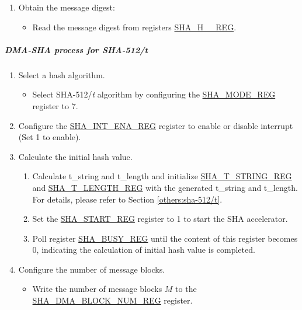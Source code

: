 \documentclass[main\_\_EN.tex]{subfiles}
\begin{document}
\begin{enumerate}
    \item Obtain the message digest:
    \begin{itemize}
        \item Read the message digest from registers \hyperref[regdesc:SHAHNREG]{SHA\_H\_\_REG}.
    \end{itemize}
\end{enumerate}

\subparagraph{DMA-SHA process for SHA-512/{\it{t}}}

\begin{enumerate}
    \item Select a hash algorithm.
    \begin{itemize}
        \item Select SHA-512/{\it{t}} algorithm by configuring the \hyperref[regdesc:SHAMODEREG]{SHA\_MODE\_REG} register to 7.
    \end{itemize}
    
    \item Configure the \hyperref[regdesc:SHAINTENAREG]{SHA\_INT\_ENA\_REG} register to enable or disable interrupt (Set 1 to enable).
    
    \item Calculate the initial hash value.    
        \begin{enumerate}
            \item Calculate t\_string and t\_length and initialize \hyperref[regdesc:SHATSTRINGREG]{SHA\_T\_STRING\_REG} and  \hyperref[regdesc:SHATLENGTHREG]{SHA\_T\_LENGTH\_REG} with the generated t\_string and t\_length. For details, please refer to Section \ref{others:sha-512/t}.
            \item Set the \hyperref[regdesc:SHASTARTREG]{SHA\_START\_REG} register to 1 to start the SHA accelerator.
            \item Poll register \hyperref[regdesc:SHABUSYREG]{SHA\_BUSY\_REG} until the content of this register becomes 0, indicating the calculation of initial hash value is completed.
        \end{enumerate}
    
    \item Configure the number of message blocks.
    \begin{itemize}
        \item  Write the number of message blocks \begin{math}M\end{math} to the  \hyperref[regdesc:SHADMABLOCKNUMREG]{SHA\_DMA\_BLOCK\_NUM\_REG} register.
    \end{itemize}
    

\end{enumerate}
\end{document}
